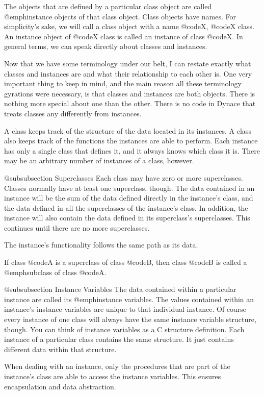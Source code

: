The objects that are defined by a particular class object are called
@emph{instance} objects of that class object.  Class objects have names. 
For simplicity's sake, we will call a class object with a name @code{X},
@code{X} class.  An instance object of @code{X} class is called an
instance of class @code{X}.  In general terms, we can speak directly
about classes and instances.

Now that we have some terminology under our belt, I can restate exactly
what classes and instances are and what their relationship to each
other is.  One very important thing to keep in mind, and the main reason 
all these terminology gyrations were necessary, is that classes and instances
are both objects.  There is nothing more special about one than the other.
There is no code in Dynace that treats classes any differently from instances.

A class keeps track of the structure of the data located in its instances.
A class also keeps track of the functions the instances are able to perform.
Each instance has only a single class that defines it, and it always
knows which class it is.  There may be an arbitrary number of instances of
a class, however.

@subsubsection  Superclasses
Each class may have zero or more superclasses.  Classes normally have at
least one superclass, though.  The data contained in an instance will
be the sum of the data defined directly in the instance's class, and the
data defined in all the superclasses of the instance's class.  In
addition, the instance will also contain the data defined in its
superclass's superclasses.  This continues until there are no more
superclasses.

The instance's functionality follows the same path as its data.

If class @code{A} is a superclass of class @code{B}, then class @code{B}
is called a @emph{subclass} of class @code{A}.

@subsubsection Instance Variables
The data contained within a particular instance are called its
@emph{instance variables}.  The values contained within an instance's
instance variables are unique to that individual instance.  Of course
every instance of one class will always have the same instance variable
structure, though.  You can think of instance variables as a C structure
definition.  Each instance of a particular class contains the same
structure.  It just contains different data within that structure.

When dealing with an instance, only the procedures that are part of the
instance's class are able to access the instance variables.  This
ensures encapsulation and data abstraction.


